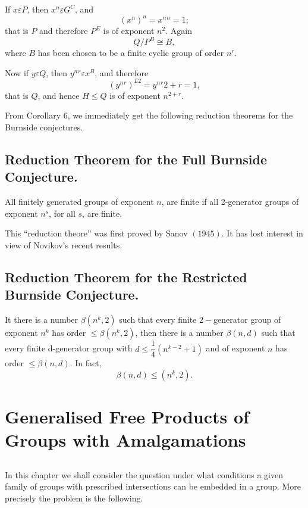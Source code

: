 If $x \varepsilon P$, then $x^n \varepsilon G^C$, and 
$$
(x^n)^n = x^n{^n} = 1;
$$
that is $P$ and therefore $P^E$ is of exponent $n^2$. Again
$$
Q/P^B \cong B,
$$
where $B$ has been chosen to be a finite cyclic group of order $n^r$. 

Now if $y \varepsilon Q$, then $y^n{^r} \varepsilon x^B$, and therefore
$$
(y^n{^r})^{L2} = y^n{^r{2+r}}= 1,
$$
that is $Q$, and hence $H \leq Q$ is of exponent $n^{2+r}$.

From Corollary $6$, we immediately get the following reduction
theorems for the Burnside conjectures. 

\section{Reduction Theorem for the Full Burnside Conjecture.}%

All finitely generated groups of exponent $n$, are finite if all
2-generator groups of exponent $n^s$, for all $s$, are finite. 

This ``reduction theore'' was first proved by Sanov $(1945)$. It has
lost interest in view of Novikov's recent results. 

\section{Reduction Theorem for the Restricted Burnside Conjecture.}%

It there is a number $\beta (n^k, 2)$ such that every finite
$2-$generator group of exponent $n^k$ has order $\leq \beta (n^k,2)$,
then there is a number $\beta (n,d)$ such that every finite
d-generator group with $d \leq  \dfrac{1}{4} (n^{k-2} +1)$ and of
exponent $n$ has order $\leq \beta (n,d)$. In fact, 
$$
\beta (n,d) \leq (n^k, 2).
$$

\chapter{Generalised Free Products of Groups with Amalgamations }%

\section{}%

In this chapter we shall consider the question under what conditions a
given family of groups with prescribed intersections can be embedded
in a group. More precisely the problem is the following. 

